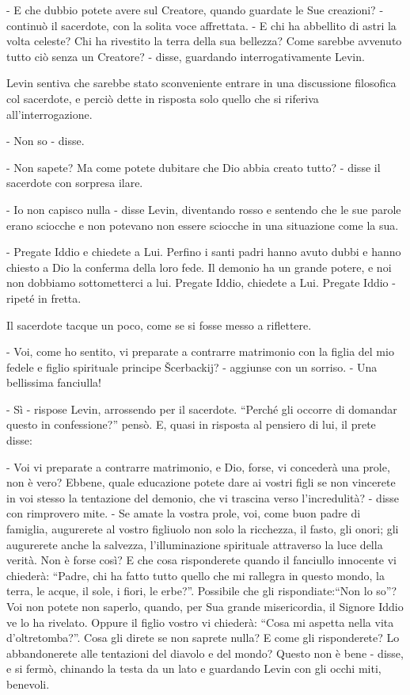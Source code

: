- E che dubbio potete avere sul Creatore, quando guardate le Sue creazioni? - continuò il sacerdote, con la solita voce affrettata. - E chi ha abbellito di astri la volta celeste? Chi ha rivestito la terra della sua bellezza? Come sarebbe avvenuto tutto ciò senza un Creatore? - disse, guardando interrogativamente Levin. 

Levin sentiva che sarebbe stato sconveniente entrare in una discussione filosofica col sacerdote, e perciò dette in risposta solo quello che si riferiva all'interrogazione. 

- Non so - disse. 

- Non sapete? Ma come potete dubitare che Dio abbia creato tutto? - disse il sacerdote con sorpresa ilare. 

- Io non capisco nulla - disse Levin, diventando rosso e sentendo che le sue parole erano sciocche e non potevano non essere sciocche in una situazione come la sua. 

- Pregate Iddio e chiedete a Lui. Perfino i santi padri hanno avuto dubbi e hanno chiesto a Dio la conferma della loro fede. Il demonio ha un grande potere, e noi non dobbiamo sottometterci a lui. Pregate Iddio, chiedete a Lui. Pregate Iddio - ripeté in fretta. 

Il sacerdote tacque un poco, come se si fosse messo a riflettere. 

- Voi, come ho sentito, vi preparate a contrarre matrimonio con la figlia del mio fedele e figlio spirituale principe Šcerbackij? - aggiunse con un sorriso. - Una bellissima fanciulla! 

- Sì - rispose Levin, arrossendo per il sacerdote. ``Perché gli occorre di domandar questo in confessione?'' pensò. E, quasi in risposta al pensiero di lui, il prete disse: 

- Voi vi preparate a contrarre matrimonio, e Dio, forse, vi concederà una prole, non è vero? Ebbene, quale educazione potete dare ai vostri figli se non vincerete in voi stesso la tentazione del demonio, che vi trascina verso l'incredulità? - disse con rimprovero mite. - Se amate la vostra prole, voi, come buon padre di famiglia, augurerete al vostro figliuolo non solo la ricchezza, il fasto, gli onori; gli augurerete anche la salvezza, l'illuminazione spirituale attraverso la luce della verità. Non è forse così? E che cosa risponderete quando il fanciullo innocente vi chiederà: ``Padre, chi ha fatto tutto quello che mi rallegra in questo mondo, la terra, le acque, il sole, i fiori, le erbe?''. Possibile che gli rispondiate:``Non lo so''? Voi non potete non saperlo, quando, per Sua grande misericordia, il Signore Iddio ve lo ha rivelato. Oppure il figlio vostro vi chiederà: ``Cosa mi aspetta nella vita d'oltretomba?''. Cosa gli direte se non saprete nulla? E come gli risponderete? Lo abbandonerete alle tentazioni del diavolo e del mondo? Questo non è bene - disse, e si fermò, chinando la testa da un lato e guardando Levin con gli occhi miti, benevoli. 

